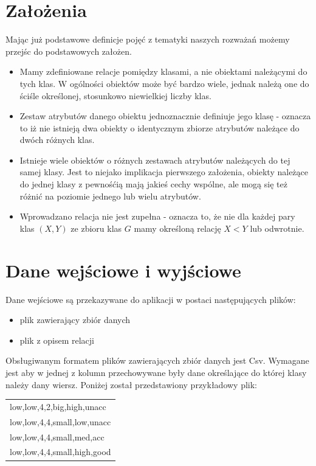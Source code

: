 \documentclass[a4paper,12pt]{article}
\begin{document}
\section{Założenia}
Mając już podstawowe definicje pojęć z tematyki naszych rozważań możemy przejśc do podstawowych założen. \\
\begin{itemize}
\item Mamy zdefiniowane relacje pomiędzy klasami, a nie obiektami należącymi do tych klas. W ogólności obiektów może być bardzo wiele, jednak należą one do ściśle określonej, stosunkowo niewielkiej liczby klas.
\item Zestaw atrybutów danego obiektu jednoznacznie definiuje jego klasę - oznacza to iż nie istnieją dwa obiekty o identycznym zbiorze atrybutów należące do dwóch różnych klas. 
\item Istnieje wiele obiektów o różnych zestawach atrybutów należących do tej samej klasy. Jest to niejako implikacja pierwszego założenia, obiekty należące do jednej klasy z pewnośćią mają jakieś cechy wspólne, ale mogą się też różnić na poziomie jednego lub wielu atrybutów. \\
\item Wprowadzano relacja nie jest zupełna - oznacza to, że nie dla każdej pary klas $(X,Y)$ ze zbioru klas $G$ mamy określoną relację $X < Y$ lub odwrotnie. 
\end{itemize}

\section{Dane wejściowe i wyjściowe}
\label{opis_danych}
Dane wejściowe są przekazywane do aplikacji w postaci następujących plików:
\begin{itemize}
\item plik zawierający zbiór danych
\item plik z opisem relacji
\end{itemize}
Obsługiwanym formatem plików zawierających zbiór danych jest Csv. Wymagane jest aby w jednej z kolumn przechowywane były dane określające do której klasy należy dany wiersz. Poniżej został przedstawiony przykładowy plik: \\

\begin{tabular}{l}
low,low,4,2,big,high,unacc \\
low,low,4,4,small,low,unacc \\
low,low,4,4,small,med,acc \\
low,low,4,4,small,high,good \\
\end{tabular}
\\
\end{document}
